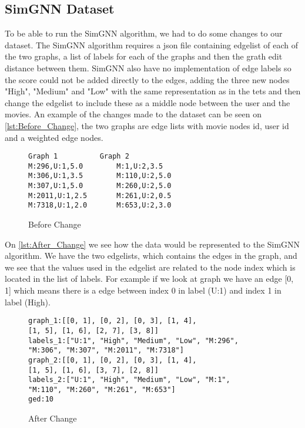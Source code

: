 \subsection{SimGNN Dataset}
To be able to run the SimGNN algorithm, we had to do some changes to our dataset. The SimGNN algorithm requires a json file containing edgelist of each of the two graphs, a list of labels for each of the graphs and then the grath edit distance between them. SimGNN also have no implementation of edge labels so the score could not be added directly to the edges, adding the three new nodes "High", "Medium" and "Low" with the same representation as in the tets and then change the edgelist to include these as a middle node between the user and the movies. 
An example of the changes made to the dataset can be seen on \autoref{lst:Before_Change}, the two graphs are edge lists with movie nodes id, user id and a weighted edge nodes. 
\begin{figure}
\begin{lstlisting}
Graph 1			 Graph 2
M:296,U:1,5.0		 M:1,U:2,3.5
M:306,U:1,3.5		 M:110,U:2,5.0
M:307,U:1,5.0		 M:260,U:2,5.0
M:2011,U:1,2.5 		 M:261,U:2,0.5
M:7318,U:1,2.0		 M:653,U:2,3.0
\end{lstlisting}
\caption{Before Change}
\label{lst:Before_Change}
\end{figure}
On \autoref{lst:After_Change} we see how the data would be represented to the SimGNN algorithm. We have the two edgelists, which contains the edges in the graph, and we see that the values used in the edgelist are related to the node index which is located in the list of labels. For example if we look at graph we have an edge [0, 1] which means there is a edge between index 0 in label (U:1) and index 1 in label (High).
\begin{figure}
\begin{lstlisting}
graph_1:[[0, 1], [0, 2], [0, 3], [1, 4], 
[1, 5], [1, 6], [2, 7], [3, 8]]
labels_1:["U:1", "High", "Medium", "Low", "M:296", 
"M:306", "M:307", "M:2011", "M:7318"]
graph_2:[[0, 1], [0, 2], [0, 3], [1, 4], 
[1, 5], [1, 6], [3, 7], [2, 8]]
labels_2:["U:1", "High", "Medium", "Low", "M:1",
"M:110", "M:260", "M:261", "M:653"]
ged:10
\end{lstlisting}
\caption{After Change}
\label{lst:After_Change}
\end{figure}


